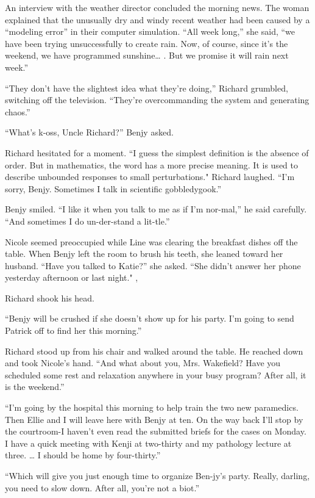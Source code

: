 \documentclass[]{article}
\begin{document}
{An interview with the weather director concluded the morning news.  The woman explained that the unusually dry and windy recent weather had been caused by a “modeling error” in their computer simulation.  “All week long,” she said, “we have been trying unsuccessfully to create rain.  Now, of course, since it’s the weekend, we have programmed sunshine… .  But we promise it will rain next week.”

“They don’t have the slightest idea what they’re doing,” Richard grumbled, switching off the television.  “They’re overcommanding the system and generating chaos.”

“What’s k-oss, Uncle Richard?” Benjy asked.

Richard hesitated for a moment.  “I guess the simplest definition is the absence of order.  But in mathematics, the word has a more precise meaning.  It is used to describe unbounded responses to small perturbations."  Richard laughed.  “I’m sorry, Benjy.  Sometimes I talk in scientific gobbledygook.”

Benjy smiled.  “I like it when you talk to me as if I’m nor-mal,” he said carefully.  “And sometimes I do un-der-stand a lit-tle.”

Nicole seemed preoccupied while Line was clearing the breakfast dishes off the table.  When Benjy left the room to brush his teeth, she leaned toward her husband.  “Have you talked to Katie?” she asked.  “She didn’t answer her phone yesterday afternoon or last night."  ,

Richard shook his head.

“Benjy will be crushed if she doesn’t show up for his party.  I’m going to send Patrick off to find her this morning.”

Richard stood up from his chair and walked around the table.  He reached down and took Nicole’s hand.  “And what about you, Mrs.  Wakefield? Have you scheduled some rest and relaxation anywhere in your busy program? After all, it is the weekend.”

“I’m going by the hospital this morning to help train the two new paramedics.  Then Ellie and I will leave here with Benjy at ten.  On the way back I’ll stop by the courtroom-I haven’t even read the submitted briefs for the cases on Monday.  I have a quick meeting with Kenji at two-thirty and my pathology lecture at three.  … I should be home by four-thirty.”

“Which will give you just enough time to organize Ben-jy’s party.  Really, darling, you need to slow down.  After all, you’re not a biot.”

}
\end{document}
